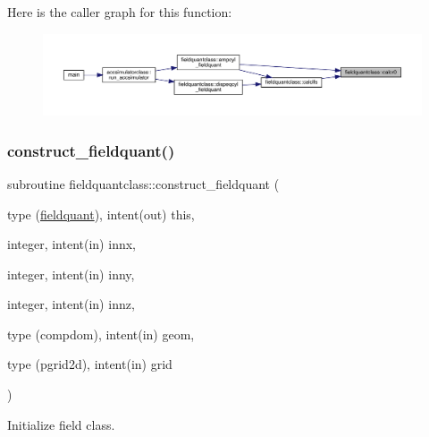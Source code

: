 Here is the caller graph for this function\+:\nopagebreak
\begin{figure}[H]
\begin{center}
\leavevmode
\includegraphics[width=350pt]{namespacefieldquantclass_a765f0fc87c405fa965c6c966794db11c_icgraph}
\end{center}
\end{figure}
\mbox{\label{namespacefieldquantclass_a02f323941fc76278b26a3aa06fa3bbdd}} 
\subsubsection{\texorpdfstring{construct\_fieldquant()}{construct\_fieldquant()}}
{\footnotesize\ttfamily subroutine fieldquantclass\+::construct\+\_\+fieldquant (\begin{DoxyParamCaption}\item[{type (\mbox{\hyperlink{namespacefieldquantclass_structfieldquantclass_1_1fieldquant}{fieldquant}}), intent(out)}]{this,  }\item[{integer, intent(in)}]{innx,  }\item[{integer, intent(in)}]{inny,  }\item[{integer, intent(in)}]{innz,  }\item[{type (compdom), intent(in)}]{geom,  }\item[{type (pgrid2d), intent(in)}]{grid }\end{DoxyParamCaption})}



Initialize field class. 


